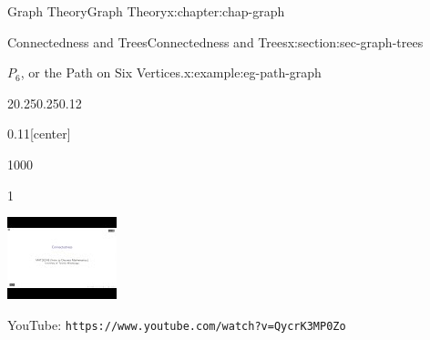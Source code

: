 \documentclass[oneside,10pt,]{book}
\newcommand{\mono}[1]{\texttt{#1}}
\numberwithin{equation}{section}
\newlength{\qrsize}
\newlength{\previewwidth}
\begin{document}
\begin{chapterptx}{Graph Theory}{}{Graph Theory}{}{}{x:chapter:chap-graph}
\begin{sectionptx}{Connectedness and Trees}{}{Connectedness and Trees}{}{}{x:section:sec-graph-trees}
\begin{example}{\(P_6\), or the Path on Six Vertices.}{x:example:eg-path-graph}
\begin{sidebyside}{2}{0.25}{0.25}{0.12}
\begin{sbspanel}{0.11}[center]
{
}%
\end{sbspanel}%
\end{sidebyside}%
\end{example}
\begin{sidebyside}{1}{0}{0}{0}%
\begin{sbspanel}{1}%
\setlength{\qrsize}{9em}
\setlength{\previewwidth}{\linewidth}
\addtolength{\previewwidth}{-\qrsize}
\begin{tcbraster}[raster columns=2, raster column skip=1pt, raster halign=center, raster force size=false, raster left skip=0pt, raster right skip=0pt]%
\begin{tcolorbox}[previewstyle, width=\previewwidth]%
\includegraphics[width=0.80\linewidth,height=\qrsize,keepaspectratio]{images/video-connectedness.jpg}%
\end{tcolorbox}%
\begin{tcolorbox}[qrstyle]%
{\hypersetup{urlcolor=black}}%
\end{tcolorbox}%
\begin{tcolorbox}[captionstyle]%
\small YouTube: \mono{https://www.youtube.com/watch?v=QycrK3MP0Zo}\end{tcolorbox}%
\end{tcbraster}%
\end{sbspanel}%
\end{sidebyside}%

\end{sectionptx}
\end{chapterptx}
\end{document}
